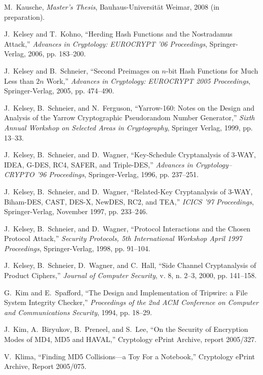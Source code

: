 \documentclass[11pt,twoside]{article}
\begin{document}
{\begin{thebibliography}{19}
 M.~Kausche, {\it Master's Thesis}, Bauhaus-Universit\"at Weimar, 2008 (in preparation).

 J.~Kelsey and T.~Kohno, ``Herding Hash Functions and the Nostradamus Attack,'' {\it Advances in Cryptology: EUROCRYPT '06 Proceedings}, Springer-Verlag, 2006, pp. 183--200.

 J.~Kelsey and B.~Schneier, ``Second Preimages on $n$-bit Hash Functions for Much Less than $2n$ Work,'' {\it Advances in Cryptology: EUROCRYPT 2005 Proceedings}, Springer-Verlag, 2005, pp. 474--490.

 J.~Kelsey, B.~Schneier, and N.~Ferguson, ``Yarrow-160: Notes on the Design and Analysis of the Yarrow Cryptographic Pseudorandom Number Generator,'' {\it Sixth Annual Workshop on Selected Areas in Cryptography}, Springer Verlag, 1999, pp. 13--33.

 J.~Kelsey, B.~Schneier, and D.~Wagner, ``Key-Schedule Cryptanalysis of 3-WAY, IDEA, G-DES, RC4, SAFER, and Triple-DES,'' {\it Advances in Cryptology--CRYPTO '96 Proceedings}, Springer-Verlag, 1996, pp. 237--251.

 J.~Kelsey, B.~Schneier, and D.~Wagner, ``Related-Key Cryptanalysis of 3-WAY, Biham-DES, CAST, DES-X, NewDES, RC2, and TEA,'' {\it ICICS '97 Proceedings}, Springer-Verlag, November 1997, pp. 233--246.

 J.~Kelsey, B.~Schneier, and D.~Wagner, ``Protocol Interactions and the Chosen Protocol Attack,'' {\it Security Protocols, 5th International Workshop April 1997 Proceedings}, Springer-Verlag, 1998, pp. 91--104.

 J.~Kelsey, B.~Schneier, D.~Wagner, and C.~Hall, ``Side Channel Cryptanalysis of Product Ciphers,'' {\it Journal of Computer Security}, v. 8, n. 2--3, 2000, pp. 141--158.

 G.~Kim and E.~Spafford, ``The Design and Implementation of Tripwire: a File System Integrity Checker,'' {\it Proceedings of the 2nd ACM Conference on Computer and Communications Security}, 1994, pp. 18--29.

 J.~Kim, A.~Biryukov, B.~Preneel, and S.~Lee, ``On the Security of Encryption Modes of MD4, MD5 and HAVAL,'' Cryptology ePrint Archive, report 2005/327.

 V.~Klima, ``Finding MD5 Collisions---a Toy For a Notebook,'' Cryptology ePrint Archive, Report 2005/075.


\end{thebibliography}}
\end{document}
